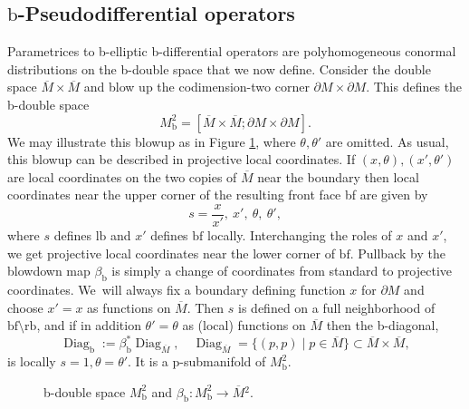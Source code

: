 \documentclass[JEP,XML,SOM,Unicode,NoFloatCountersInSection,published]{cedram}
\theoremstyle{plain}
\theoremstyle{definition}
\newcommand{\lf}{{\mathrm{lb}}}
\newcommand{\rf}{{\mathrm{rb}}}
\newcommand{\bb}{{\mathrm{b}}}
\newcommand{\bbf}{{\mathrm{bf}}}
\DeclareMathOperator{\Diag}{Diag}
\newcommand{\dM}{{\partial M}}
\newcommand{\Mbar}{{\overline{M}}}\let\M\Mbar
\begin{document}
\subsection{\texorpdfstring{$\bb$}{b}-Pseudodifferential operators}
Parametrices to b-elliptic b-differential operators are polyhomogeneous conormal
distributions on the b-double space that we now define. Consider the double space $\Mbar \times \Mbar$ and
blow up the codimension-two corner $\partial M \times \partial M$. This defines the
b-double space
\begin{equation*}
M^{2}_{\text{b}} =
[ \Mbar \times \Mbar ; \partial M \times \partial M].
\end{equation*}
We may illustrate this blowup as in Figure \ref{figure 1}, where $\theta,\theta'$ are omitted.
As usual, this blowup can be described in projective local coordinates.
If $(x,\theta),(x',\theta')$ are local coordinates on the two copies of $\Mbar$ near the boundary
then local coordinates near the upper corner of the resulting front face bf are given by
\begin{equation}\label{sx}
s = \frac{x}{x'}, \ x',\ \theta, \ \theta',
\end{equation}
where $s$ defines $\lf$ and $x'$ defines $\bbf$ locally. Interchanging the roles of $x$ and $x'$, we get projective local coordinates
near the lower corner of $\bbf$. Pullback by the blowdown map $\beta_\bb$ is simply a change of
coordinates from standard to projective coordinates.
We~will always fix a boundary defining function $x$ for $\dM$ and choose $x'=x$ as functions on $\Mbar$. Then $s$ is defined on a full neighborhood of $\bbf\setminus\rf$, and if in addition $\theta'=\theta$ as (local) functions on $\Mbar$ then the b-diagonal,
\[
\Diag_\bb :=\beta_\bb^*\Diag_\Mbar,\quad \Diag_\Mbar=\{(p,p)\mid p\in \Mbar\}\subset\Mbar\times\Mbar,
\]
is locally $s=1,\theta=\theta'$. It is a p-submanifold of $M^2_\bb$.

\begin{figure}[htb]
\centering

\caption{b-double space $M^{2}_\bb$ and $\beta_\bb: M^{2}_\bb \to \Mbar{}^2$.} \label{figure 1}
\end{figure}
\end{document}
